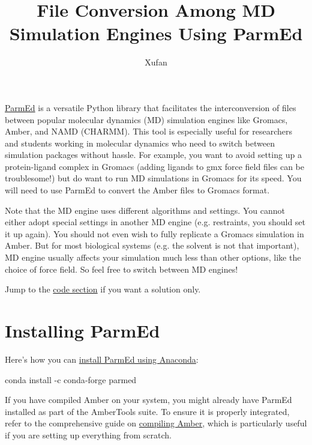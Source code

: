 \documentclass[
]{article}
\title{File Conversion Among MD Simulation Engines Using ParmEd}
\author{Xufan}
\date{}
\newenvironment{Shaded}{}{}
\newcommand{\AttributeTok}[1]{\textcolor[rgb]{0.49,0.56,0.16}{#1}}
\newcommand{\ExtensionTok}[1]{#1}
\newcommand{\NormalTok}[1]{#1}
\begin{document}
\maketitle

\href{https://parmed.github.io/ParmEd/html/index.html}{ParmEd} is a
versatile Python library that facilitates the interconversion of files
between popular molecular dynamics (MD) simulation engines like Gromacs,
Amber, and NAMD (CHARMM). This tool is especially useful for researchers
and students working in molecular dynamics who need to switch between
simulation packages without hassle. For example, you want to avoid
setting up a protein-ligand complex in Gromacs (adding ligands to gmx
force field files can be troublesome!) but do want to run MD simulations
in Gromacs for its speed. You will need to use ParmEd to convert the
Amber files to Gromacs format.

Note that the MD engine uses different algorithms and settings. You
cannot either adopt special settings in another MD engine (e.g.
restraints, you should set it up again). You should not even wish to
fully replicate a Gromacs simulation in Amber. But for most biological
systems (e.g. the solvent is not that important), MD engine usually
affects your simulation much less than other options, like the choice of
force field. So feel free to switch between MD engines!

Jump to the \protect\hyperlink{code}{code section} if you want a
solution only.

\hypertarget{installing-parmed}{%
\section{Installing ParmEd}\label{installing-parmed}}

Here's how you can
\href{https://anaconda.org/conda-forge/parmed}{install ParmEd using
Anaconda}:

\begin{Shaded}
\begin{Highlighting}[]
\ExtensionTok{conda}\NormalTok{ install }\AttributeTok{{-}c}\NormalTok{ conda{-}forge parmed}
\end{Highlighting}
\end{Shaded}

If you have compiled Amber on your system, you might already have ParmEd
installed as part of the AmberTools suite. To ensure it is properly
integrated, refer to the comprehensive guide on
\href{https://www.bilibili.com/read/cv23212288/}{compiling Amber}, which
is particularly useful if you are setting up everything from scratch.
\end{document}
